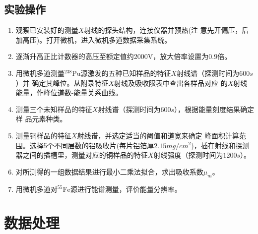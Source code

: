 \documentclass{article}
\begin{document}
    \subsection{实验操作}
    \begin{enumerate}
        \item 观察已安装好的测量$X$射线的探头结构，连接仪器并预热(注
        意先开偏压，后加高压)。打开微机，进入微机多道数据采集系统。
        \item 逐渐升高正比计数器的高压至额定值约2000V，放大倍率设置为$0.9$倍。
        \item 用微机多道测量$^{238}\text{Pu}$源激发的五种已知样品的特征$X$射线谱（探测时间为$600\si{s}$）并
        确定其峰位。从附录特征$X$射线及吸收限表中查出各样品对应
        的$X$射线能量，作峰位道数-能量关系曲线。 
        \item 测量三个未知样品的特征$X$射线谱（探测时间为$600\si{s}$），根据能量刻度结果确定样
        品元素种类。
        \item 测量铜样品的特征$X$射线谱，并选定适当的阈值和道宽来确定
        峰面积计算范围。选择5个不同层数的铝吸收片(每片铝箔厚$2.15\si{mg\per cm^2}$)，插在射线和探测器之间的插槽里，测量对应的铜样品的特征$X$射线强度（探测时间为$1200\si{s}$）。
        \item 对所测得的一组数据结果进行最小二乘法拟合，求出吸收系数$\mu_m$。
        \item 用微机多道对$^{55}\text{Fe}$源进行能谱测量，评价能量分辨率。
    \end{enumerate}
    \section{数据处理}
\end{document}
